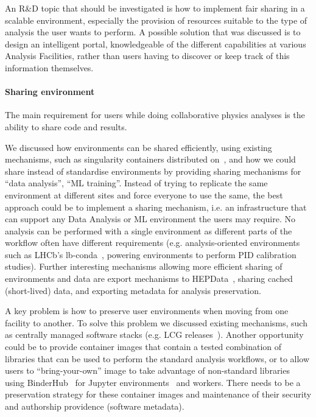 \documentclass[a4paper,11pt]{article}
\begin{document}
An R\&D topic that should be investigated is how to implement fair
sharing in a scalable environment, especially the provision of resources
suitable to the type of analysis the user wants to perform. A possible
solution that was discussed is to design an intelligent portal,
knowledgeable of the different capabilities at various Analysis
Facilities, rather than users having to discover or keep track of this
information themselves.

\hypertarget{sharing-environment}{%
\paragraph{Sharing environment}\label{sharing-environment}}

The main requirement for users while doing collaborative physics
analyses is the ability to share code and results.

We discussed how environments can be shared efficiently, using existing
mechanisms, such as singularity containers distributed on~\cite{cvmfs}, and how
we could share instead of standardise environments by providing sharing
mechanisms for ``data analysis'', ``ML training''. Instead of trying to
replicate the same environment at different sites and force everyone
to use the same, the best approach could be to implement a sharing
mechanism, i.e. an infrastructure that can support any Data Analysis or
ML environment the users may require. No analysis can be performed with
a single environment as different parts of the workflow often have
different requirements (e.g. analysis-oriented environments such as
LHCb's lb-conda~\cite{lbconda}, powering environments to perform PID calibration
studies). Further interesting mechanisms allowing more efficient sharing
of environments and data are export mechanisms to HEPData~\cite{maguire2017hepdata}, sharing
cached (short-lived) data, and exporting metadata for analysis
preservation.

A key problem is how to preserve user environments when moving from one
facility to another. To solve this problem we discussed existing
mechanisms, such as centrally managed software stacks (e.g. LCG
releases~\cite{villanueva2019building}). Another opportunity could be to provide container images that
contain a tested combination of libraries that can be used to perform
the standard analysis workflows, or to allow users to ``bring-your-own''
image to take advantage of non-standard libraries using BinderHub~\cite{binderhub} for
Jupyter environments~\cite{jupyter} and workers. There needs to be a preservation
strategy for these container images and maintenance of their security
and authorship providence (software metadata).
\end{document}
